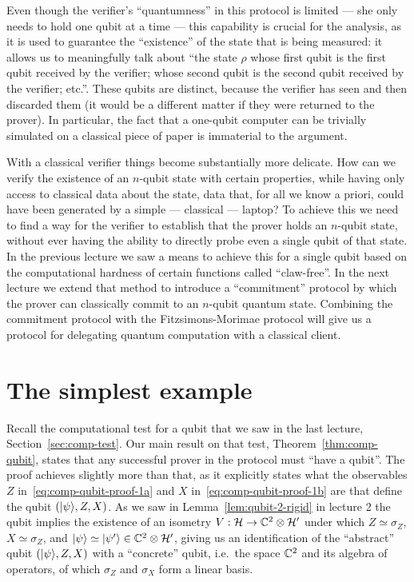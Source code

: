 Even though the verifier's ``quantumness'' in this protocol is limited --- she only needs to hold one qubit at a time --- this capability is crucial for the analysis, as it is used to guarantee the ``existence'' of the state that is being measured: it allows us to meaningfully talk about ``the state $\rho$ whose first qubit is the first qubit received by the verifier; whose second qubit is the second qubit received by the verifier; etc.''. These qubits are distinct, because the verifier has seen and then discarded them (it would be a different matter if they were returned to the prover). In particular, the fact that a one-qubit computer can be trivially simulated on a classical piece of paper is immaterial to the argument.

With a classical verifier things become substantially more delicate. How can we verify the existence of an $n$-qubit state with certain properties, while having only access to classical data about the state, data that, for all we know a priori, could have been generated by a simple --- classical --- laptop? To achieve this we need to find a way for the verifier to establish that the prover holds an $n$-qubit state, without ever having the ability to directly probe even a single qubit of that state. In the previous lecture we saw a means to achieve this for a single qubit based on the computational hardness of certain functions called ``claw-free''. In the next lecture we extend that method to introduce a ``commitment'' protocol by which the prover can classically commit to an $n$-qubit quantum state. Combining the commitment protocol with the Fitzsimons-Morimae protocol will give us a protocol for delegating quantum computation with a classical client. 

\section{The simplest example}

Recall the computational test for a qubit that we saw in the last lecture, Section~\ref{sec:comp-test}. Our main result on that test, Theorem~\ref{thm:comp-qubit}, states that any successful prover in the protocol must ``have a qubit''. The proof achieves slightly more than that, as it explicitly states what the observables $Z$ in~\eqref{eq:comp-qubit-proof-1a} and $X$ in~\eqref{eq:comp-qubit-proof-1b} are that define the qubit $(|\psi\rangle,Z,X)$. As we saw in Lemma~\ref{lem:qubit-2-rigid} in lecture 2 the qubit implies the existence of an isometry $V:\mathcal{H}\to \mathbb{C}^2\otimes \mathcal{H}'$ under which $Z\simeq \sigma_Z$, $X\simeq \sigma_Z$, and $|\psi\rangle\simeq |\psi'\rangle \in \mathbb{C}^2 \otimes \mathcal{H}'$, giving us an identification of the ``abstract'' qubit $(|\psi\rangle,Z,X)$ with a ``concrete'' qubit, i.e.\ the space $\mathbb{C}^2$ and its algebra of operators, of which $\sigma_Z$ and $\sigma_X$ form a linear basis. 

